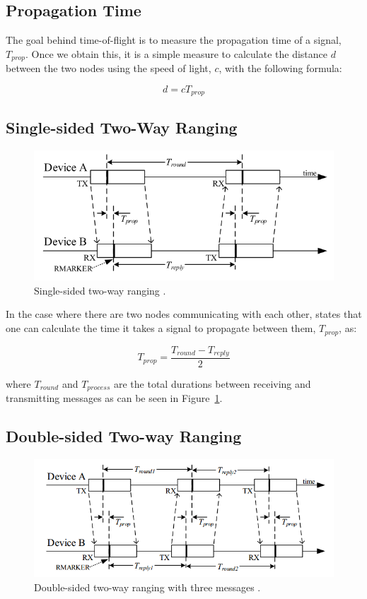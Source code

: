 \subsection{Propagation Time}
The goal behind time-of-flight is to measure the propagation time of a signal, $T_{prop}$. Once we obtain this, it is a simple measure to calculate the distance $d$ between the two nodes using the speed of light, $c$, with the following formula:

\[
	d = c T_{prop}
\] 

\subsection{Single-sided Two-Way Ranging}
\begin{figure}
	\centering
	\includegraphics[width=\linewidth]{Figures/BasicRanging.png}
	\decoRule
	\caption{Single-sided two-way ranging \cite{DW1000UserManual}.}
	\label{fig:BasicRanging}
\end{figure}

In the case where there are two nodes communicating with each other, \parencite{DW1000UserManual} states that one can calculate the time it takes a signal to propagate between them, $T_{prop}$, as:

\[
	T_{prop} = \frac{T_{round} - T_{reply}}{2}
\]

where $T_{round}$ and $T_{process}$ are the total durations between receiving and transmitting messages as can be seen in Figure~\ref{fig:BasicRanging}.

\subsection{Double-sided Two-way Ranging}
\label{DSTWR}

\begin{figure}
	\centering
	\includegraphics[width=\linewidth]{Figures/AsyncRanging.png}
	\decoRule
	\caption{Double-sided two-way ranging with three messages \cite{DW1000UserManual}.}
	\label{fig:AsyncRanging}
\end{figure}

